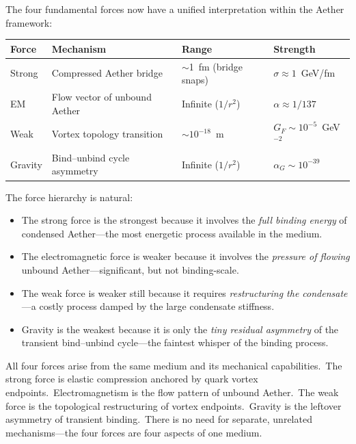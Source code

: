 ﻿\documentclass[12pt,letterpaper]{article}
\begin{document}
The four fundamental forces now have a unified interpretation within the Aether
framework:
%
\begin{center}
\begin{tabular}{@{}llll@{}}
\hline
\textbf{Force} & \textbf{Mechanism} & \textbf{Range} & \textbf{Strength} \\
\hline
Strong    & Compressed Aether bridge  & $\sim$1~fm (bridge snaps)    & $\sigma \approx 1$~GeV/fm \\
EM        & Flow vector of unbound Aether   & Infinite ($1/r^2$)    & $\alpha \approx 1/137$ \\
Weak      & Vortex topology transition      & $\sim 10^{-18}$~m     & $G_F \sim 10^{-5}$~GeV$^{-2}$ \\
Gravity   & Bind--unbind cycle asymmetry    & Infinite ($1/r^2$)    & $\alpha_G \sim 10^{-39}$ \\
\hline
\end{tabular}
\end{center}
%
The force hierarchy is natural:
%
\begin{itemize}[leftmargin=2em]
  \item The strong force is the strongest because it involves the \emph{full binding
    energy} of condensed Aether---the most energetic process available in the medium.
  \item The electromagnetic force is weaker because it involves the \emph{pressure of
    flowing} unbound Aether---significant, but not binding-scale.
  \item The weak force is weaker still because it requires \emph{restructuring the
    condensate}---a costly process damped by the large condensate stiffness.
  \item Gravity is the weakest because it is only the \emph{tiny residual asymmetry}
    of the transient bind--unbind cycle---the faintest whisper of the binding process.
\end{itemize}
%
All four forces arise from the same medium and its mechanical capabilities.\
The strong force is elastic compression anchored by quark vortex endpoints.\
Electromagnetism is the flow pattern of unbound Aether.\ The weak force is the
topological restructuring of vortex endpoints.\ Gravity is the leftover asymmetry
of transient binding.\ There is no need for separate, unrelated mechanisms---the
four forces are four aspects of one medium.



\end{document}
